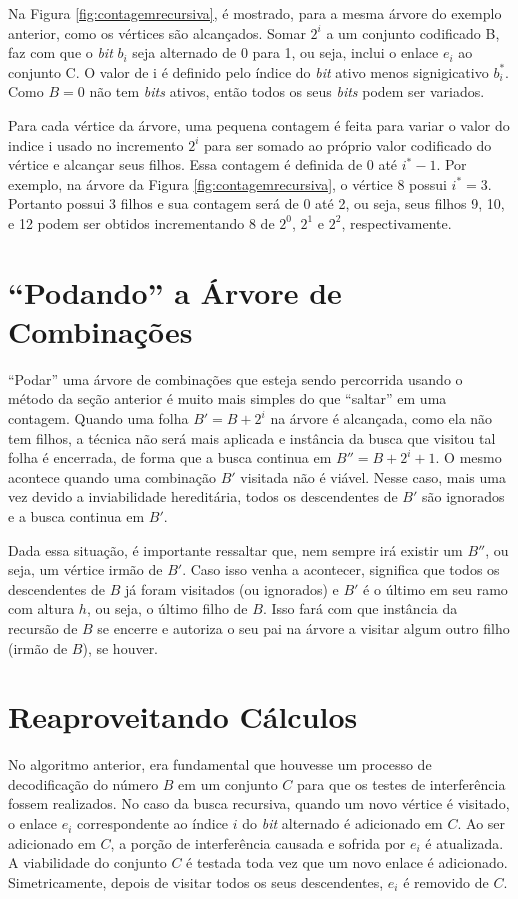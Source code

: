 Na Figura \ref{fig:contagemrecursiva}, é mostrado, para a mesma árvore do exemplo anterior, como os vértices são alcançados. Somar $2^i$ a um conjunto codificado B, faz com que o {\it bit} $b_i$ seja alternado de 0 para 1, ou seja, inclui o enlace $e_i$ ao conjunto C. O valor de i é definido pelo índice do {\it bit} ativo menos signigicativo $b^*_i$. Como $B=0$ não tem {\it bits} ativos, então todos os seus {\it bits} podem ser variados.

Para cada vértice da árvore, uma pequena contagem é feita para variar o valor do indice i usado no incremento $2^i$ para ser somado ao próprio valor codificado do vértice e alcançar seus filhos. Essa contagem é definida de 0 até $i^*-1$. Por exemplo, na árvore da Figura \ref{fig:contagemrecursiva}, o vértice 8 possui $i^*=3$. Portanto possui 3 filhos e sua contagem será de 0 até 2, ou seja, seus filhos 9, 10, e 12 podem ser obtidos incrementando 8 de $2^0$, $2^1$ e $2^2$, respectivamente.

\section{“Podando” a Árvore de Combinações}

“Podar” uma árvore de combinações que esteja sendo percorrida usando o método da seção anterior é muito mais simples do que “saltar” em uma contagem. Quando uma folha $B' = B + 2^i$ na árvore é alcançada, como ela não tem filhos, a técnica não será mais aplicada e instância da busca que visitou tal folha é encerrada, de forma que a busca continua em $B''=B+2^i+1$. O mesmo acontece quando uma combinação $B'$ visitada não é viável. Nesse caso, mais uma vez devido a inviabilidade hereditária, todos os descendentes de $B'$ são ignorados e a busca continua em $B'$.

Dada essa situação, é importante ressaltar que, nem sempre irá existir um $B''$, ou seja, um vértice irmão de $B'$. Caso isso venha a acontecer, significa que todos os descendentes de $B$ já foram visitados (ou ignorados) e $B'$ é o último em seu ramo com altura $h$, ou seja, o último filho de $B$. Isso fará com que instância da recursão de $B$ se encerre e autoriza o seu pai na árvore a visitar algum outro filho (irmão de $B$), se houver. 

\section{Reaproveitando Cálculos}

No algoritmo anterior, era fundamental que houvesse um processo de decodificação do número $B$ em um conjunto $C$ para que os testes de interferência fossem realizados. No caso da busca recursiva, quando um novo vértice é visitado, o enlace $e_i$ correspondente ao índice $i$ do {\it bit} alternado é adicionado em $C$. Ao ser adicionado em $C$, a porção de interferência causada e sofrida por $e_i$ é atualizada. A viabilidade do conjunto $C$ é testada toda vez que um novo enlace é adicionado. Simetricamente, depois de visitar todos os seus descendentes, $e_i$ é removido de $C$.

